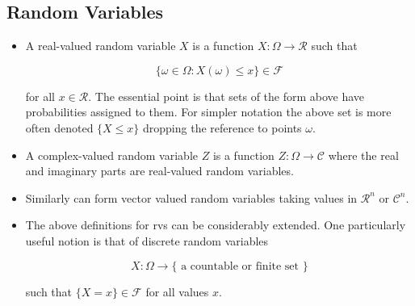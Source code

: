 \documentclass[12pt,thmsa]{article}
\begin{document}
\subsection{Random Variables}
\begin{itemize}
	\item A real-valued random variable $X$ is a function $X: \Omega \rightarrow \mathcal{R}$ such that

	$$
	\{\omega \in \Omega: X(\omega) \leq x\} \in \mathcal{F}
	$$
	
	for all $x \in \mathcal{R}$. The essential point is that sets of the form above have probabilities assigned to them. For simpler notation the above set is more often denoted $\{X \leq x\}$ dropping the reference to points $\omega$.

	\item A complex-valued random variable $Z$ is a function $Z: \Omega \rightarrow \mathcal{C}$ where the real and imaginary parts are real-valued random variables.
	
	\item Similarly can form vector valued random variables taking values in $\mathcal{R}^{n}$ or $\mathcal{C}^{n}$.
	
	\item The above definitions for rvs can be considerably extended. One particularly useful notion is that of discrete random variables

	$$
	X: \Omega \rightarrow\{\text { a countable or finite set }\}
	$$
	
	such that $\{X=x\} \in \mathcal{F}$ for all values $x$.

\end{itemize}
\end{document}
